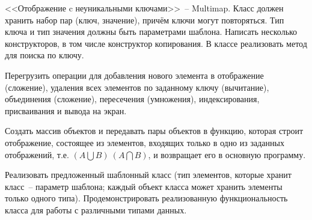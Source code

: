 <<Отображение c неуникальными ключами>>~-- Multimap. Класс должен хранить набор
пар (ключ, значение), причём ключи могут повторяться. Тип ключа и тип значения должны
быть параметрами шаблона. Написать несколько конструкторов, в том числе конструктор
копирования. В классе реализовать метод для поиска по ключу.

Перегрузить операции для
добавления нового элемента в отображение (сложение), удаления всех элементов по
заданному ключу (вычитание), объединения (сложение), пересечения (умножения),
индексирования, присваивания и вывода на экран.

Создать массив объектов и передавать
пары объектов в функцию, которая строит отображение, состоящее из элементов,
входящих только в одно из заданных отображений, т.е. $(A\bigcup B) \ (A\bigcap B)$, и возвращает его в
основную программу.

Реализовать предложенный шаблонный класс (тип элементов, которые
хранит класс~-- параметр шаблона; каждый объект класса может хранить
элементы только одного типа). Продемонстрировать реализованную
функциональность класса для работы с различными типами данных.


